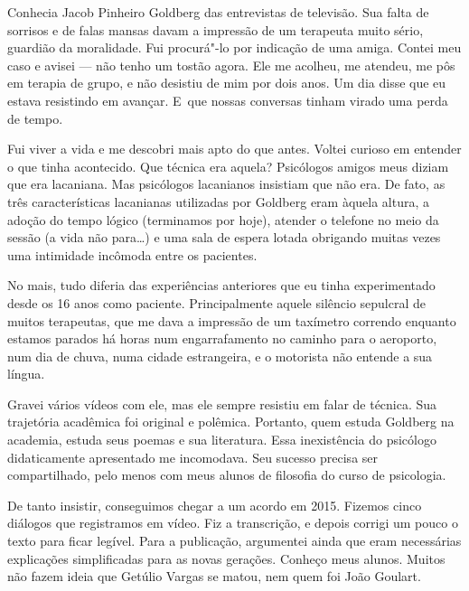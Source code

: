  

Conhecia Jacob Pinheiro Goldberg das entrevistas de televisão. Sua falta
de sorrisos e de falas mansas davam a impressão de um terapeuta muito
sério, guardião da moralidade. Fui procurá"-lo por indicação de uma
amiga. Contei meu caso e avisei --- não tenho um tostão agora. Ele me
acolheu, me atendeu, me pôs em terapia de grupo, e não desistiu de mim
por dois anos. Um dia disse que eu estava resistindo em avançar. E~que
nossas conversas tinham virado uma perda de tempo.

Fui viver a vida e me descobri mais apto do que antes. Voltei curioso em
entender o que tinha acontecido. Que técnica era aquela? Psicólogos
amigos meus diziam que era lacaniana. Mas psicólogos lacanianos
insistiam que não era. De fato, as três características lacanianas
utilizadas por Goldberg eram àquela altura, a adoção do tempo lógico
(terminamos por hoje), atender o telefone no meio da sessão (a vida não
para…) e uma sala de espera lotada obrigando muitas vezes uma
intimidade incômoda entre os pacientes.

No mais, tudo diferia das experiências anteriores que eu tinha
experimentado desde os 16 anos como paciente. Principalmente aquele
silêncio sepulcral de muitos terapeutas, que me dava a impressão de um
taxímetro correndo enquanto estamos parados há horas num engarrafamento
no caminho para o aeroporto, num dia de chuva, numa cidade estrangeira,
e o motorista não entende a sua língua.

Gravei vários vídeos com ele, mas ele sempre resistiu em falar de
técnica. Sua trajetória acadêmica foi original e polêmica. Portanto,
quem estuda Goldberg na academia, estuda seus poemas e sua literatura.
Essa inexistência do psicólogo didaticamente apresentado me incomodava.
Seu sucesso precisa ser compartilhado, pelo menos com meus alunos de
filosofia do curso de psicologia.

De tanto insistir, conseguimos chegar a um acordo em 2015. Fizemos cinco
diálogos que registramos em vídeo. Fiz a transcrição, e depois corrigi
um pouco o texto para ficar legível. Para a publicação, argumentei ainda
que eram necessárias explicações simplificadas para as novas gerações.
Conheço meus alunos. Muitos não fazem ideia que Getúlio Vargas se matou,
nem quem foi João Goulart.


